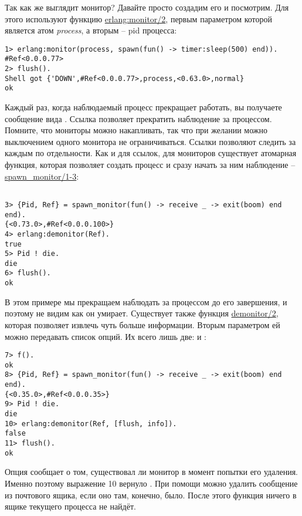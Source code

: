 Так как же выглядит монитор?
Давайте просто создадим его и посмотрим.
Для этого используют функцию \href{http://erldocs.com/R15B/erts/erlang.html\#monitor/2}{erlang:monitor/2}, первым параметром которой является атом \emph{process}, а вторым \--- pid процесса:
\begin{lstlisting}[style=erlang]
1> erlang:monitor(process, spawn(fun() -> timer:sleep(500) end)).
#Ref<0.0.0.77>
2> flush().
Shell got {'DOWN',#Ref<0.0.0.77>,process,<0.63.0>,normal}
ok
\end{lstlisting}

Каждый раз, когда наблюдаемый процесс прекращает работать, вы получаете сообщение вида .
Ссылка позволяет прекратить наблюдение за процессом.
Помните, что мониторы можно накапливать, так что при желании можно выключением одного монитора не ограничиваться.
Ссылки позволяют следить за каждым по отдельности.
Как и для ссылок, для мониторов существует атомарная функция, которая позволяет создать процесс и сразу начать за ним наблюдение \--- \href{http://erldocs.com/R15B/erts/erlang.html\#spawn_monitor/1}{spawn\_monitor/1-3}:
\begin{lstlisting}[style=erlang]

3> {Pid, Ref} = spawn_monitor(fun() -> receive _ -> exit(boom) end end).
{<0.73.0>,#Ref<0.0.0.100>}
4> erlang:demonitor(Ref).
true
5> Pid ! die.
die
6> flush().
ok
\end{lstlisting}

В этом примере мы прекращаем наблюдать за процессом до его завершения, и поэтому не видим как он умирает.
Существует также функция \href{http://erldocs.com/R15B/erts/erlang.html\#demonitor/2}{demonitor/2}, которая позволяет извлечь чуть больше информации.
Вторым параметром ей можно передавать список опций.
Их всего лишь две:  и :
\begin{lstlisting}[style=erlang]
7> f().
ok
8> {Pid, Ref} = spawn_monitor(fun() -> receive _ -> exit(boom) end end).
{<0.35.0>,#Ref<0.0.0.35>}
9> Pid ! die.
die
10> erlang:demonitor(Ref, [flush, info]).
false
11> flush().
ok
\end{lstlisting}

Опция  сообщает о том, существовал ли монитор в момент попытки его удаления.
Именно поэтому выражение 10 вернуло .
При помощи  можно удалить сообщение  из почтового ящика, если оно там, конечно, было.
После этого функция  ничего в ящике текущего процесса не найдёт.
